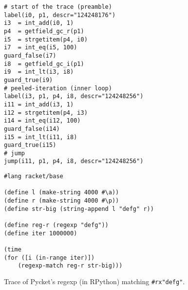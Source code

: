 \begin{figure}[tbp]
		\centering
\begin{minipage}{0.9\textwidth}
\begin{lstlisting}[language=rptrace]
# start of the trace (preamble)
label(i0, p1, descr="124248176")
i3  = int_add(i0, 1)
p4  = getfield_gc_r(p1)
i5  = strgetitem(p4, i0)
i7  = int_eq(i5, 100)
guard_false(i7)
i8  = getfield_gc_i(p1)
i9  = int_lt(i3, i8)
guard_true(i9)
# peeled-iteration (inner loop)
label(i3, p1, p4, i8, descr="124248256")
i11 = int_add(i3, 1)
i12 = strgetitem(p4, i3)
i14 = int_eq(i12, 100)
guard_false(i14)
i15 = int_lt(i11, i8)
guard_true(i15)
# jump
jump(i11, p1, p4, i8, descr="124248256")
\end{lstlisting}
\end{minipage}

		\vspace{0.8em} %

		\begin{minipage}{0.9\textwidth}
\begin{lstlisting}[language=racket]
#lang racket/base

(define l (make-string 4000 #\a))
(define r (make-string 4000 #\p))
(define str-big (string-append l "defg" r))

(define reg-r (regexp "defg"))
(define iter 1000000)

(time
(for ([i (in-range iter)])
	(regexp-match reg-r str-big)))
\end{lstlisting}
		\end{minipage}

		\caption{\small Trace of Pycket’s regexp (in RPython) matching
				{\tt\#rx"defg"}.}
		\label{fig:regexp-trace}
	\end{figure}